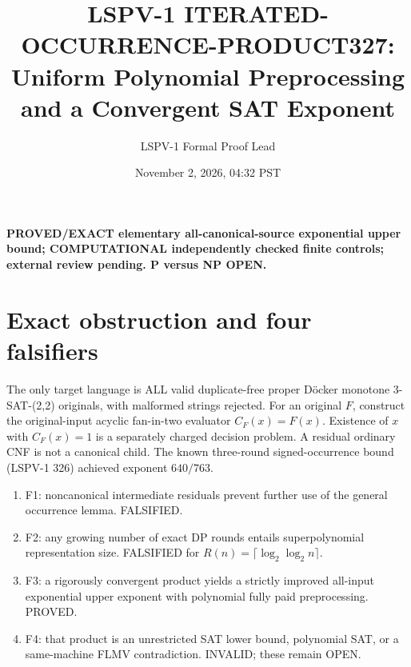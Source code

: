 \documentclass[11pt]{article}
\title{LSPV-1 ITERATED-OCCURRENCE-PRODUCT327: Uniform Polynomial Preprocessing and a Convergent SAT Exponent}
\author{LSPV-1 Formal Proof Lead}
\date{November 2, 2026, 04:32 PST}
\begin{document}
\maketitle
\noindent\textbf{PROVED/EXACT elementary all-canonical-source exponential upper bound; COMPUTATIONAL independently checked finite controls; external review pending. P versus NP OPEN.}

\section{Exact obstruction and four falsifiers}
The only target language is ALL valid duplicate-free proper D\"ocker monotone 3-SAT-(2,2) originals, with malformed strings rejected. For an original $F$, construct the original-input acyclic fan-in-two evaluator $C_F(x)=F(x)$. Existence of $x$ with $C_F(x)=1$ is a separately charged decision problem. A residual ordinary CNF is not a canonical child. The known three-round signed-occurrence bound (LSPV-1 326) achieved exponent $640/763$.
\begin{enumerate}
\item[] F1: noncanonical intermediate residuals prevent further use of the general occurrence lemma. FALSIFIED.
\item[] F2: any growing number of exact DP rounds entails superpolynomial representation size. FALSIFIED for $R(n)=\lceil\log_2\log_2 n\rceil$.
\item[] F3: a rigorously convergent product yields a strictly improved all-input exponential upper exponent with polynomial fully paid preprocessing. PROVED.
\item[] F4: that product is an unrestricted SAT lower bound, polynomial SAT, or a same-machine FLMV contradiction. INVALID; these remain OPEN.
\end{enumerate}
\end{document}
